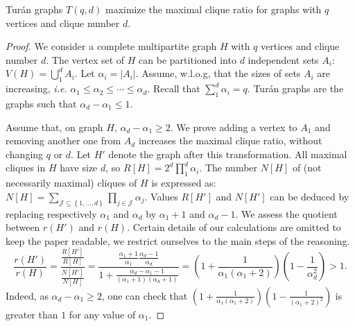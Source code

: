 \documentclass[a4paper,UKenglish,numberwithinsect,cleveref, autoref]{lipics-v2021}
\newcommand{\set}[1]{\left\{ #1 \right\}}
\newcommand{\card}[1]{\left| #1 \right|}
\begin{document}
\begin{theorem}
Tur\'an graphs $T(q,d)$ maximize the maximal clique ratio for graphs with $q$ vertices and clique number $d$.
\label{th:turan}
\end{theorem}
\begin{proof}
We consider a complete multipartite graph $H$ with $q$ vertices and clique number $d$. The vertex set of $H$ can be partitioned into $d$ independent sets $A_i$: $V(H) = \bigcup_1^d A_i$. Let $\alpha_i = \card{A_i}$. Assume, w.l.o.g, that the sizes of sets $A_i$ are increasing, {\em i.e.} $\alpha_1 \le \alpha_2 \le \cdots \le \alpha_d$. Recall that $\sum_1^d \alpha_i = q$. Tur\'an graphs are the graphs such that $\alpha_d - \alpha_1 \le 1$.

Assume that, on graph $H$, $\alpha_d - \alpha_1 \ge 2$. We prove adding a vertex to $A_1$ and removing another one from $A_d$ increases the maximal clique ratio, without changing $q$ or $d$. Let $H'$ denote the graph after this transformation. All maximal cliques in $H$ have size $d$, so $R\left[ H\right] = 2^d \prod_1^d \alpha_i$. The number $N\left[ H\right]$ of (not necessarily maximal) cliques of $H$ is expressed as: $N\left[ H\right] = \sum\limits_{\mathcal{J} \subseteq \set{1,\ldots,d}} \prod_{j \in \mathcal{J}} \alpha_j$. Values $R\left[ H'\right]$ and $N\left[ H'\right]$ can be deduced by replacing respectively $\alpha_1$ and $\alpha_d$ by $\alpha_1 + 1$ and $\alpha_d-1$. We assess the quotient between $r(H')$ and $r(H)$. Certain details of our calculations are omitted to keep the paper readable, we restrict ourselves to the main steps of the reasoning. 
\[
\frac{r(H')}{r(H)} = \frac{\frac{R\left[ H'\right]}{R\left[ H\right]}}{\frac{N\left[ H'\right]}{N\left[ H\right]}} = \frac{\frac{\alpha_1+1}{\alpha_1}\frac{\alpha_d-1}{\alpha_d}}{1+\frac{\alpha_d-\alpha_1-1}{(\alpha_1+1)(\alpha_d+1)}} = \left(1+\frac{1}{\alpha_1(\alpha_1+2)}\right)\left(1-\frac{1}{\alpha_d^2}\right) >  1.
\]
Indeed, as $\alpha_d - \alpha_1 \ge 2$, one can check that $\left(1+\frac{1}{\alpha_1(\alpha_1+2)}\right)\left(1-\frac{1}{(\alpha_1+2)^2}\right)$ is greater than $1$ for any value of $\alpha_1$.
\end{proof}
\end{document}
